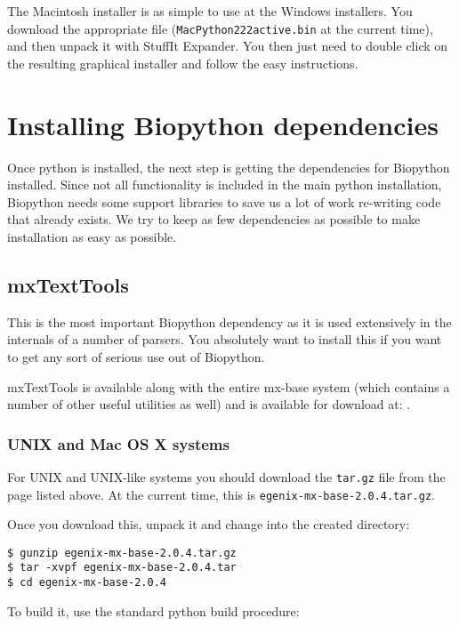 \documentclass{article}
\begin{document}
The Macintosh installer is as simple to use at the Windows installers.
You download the appropriate file (\verb|MacPython222active.bin| at the
current time), and then unpack it with StuffIt Expander. You then just
need to double click on the resulting graphical installer and follow the
easy instructions.

\section{Installing Biopython dependencies}

Once python is installed, the next step is getting the dependencies
for Biopython installed. Since not all functionality is included in the
main python installation, Biopython needs some support libraries to save
us a lot of work re-writing code that already exists. We try to keep
as few dependencies as possible to make installation as easy as
possible.

\subsection{mxTextTools}

This is the most important Biopython dependency as it is used
extensively in the internals of a number of parsers. You absolutely want
to install this if you want to get any sort of serious use out of
Biopython.


mxTextTools is available along with the entire mx-base system (which
contains a number of other useful utilities as well) and is available
for download at:
.

\subsubsection{UNIX and Mac OS X systems}

For UNIX and UNIX-like systems you should download the \verb|tar.gz|
file from the page listed above. At the current time, this is
\verb|egenix-mx-base-2.0.4.tar.gz|.

Once you download this, unpack it and change into the created directory:

\begin{verbatim}
$ gunzip egenix-mx-base-2.0.4.tar.gz 
$ tar -xvpf egenix-mx-base-2.0.4.tar
$ cd egenix-mx-base-2.0.4
\end{verbatim}

To build it, use the standard python build procedure:
\end{document}
